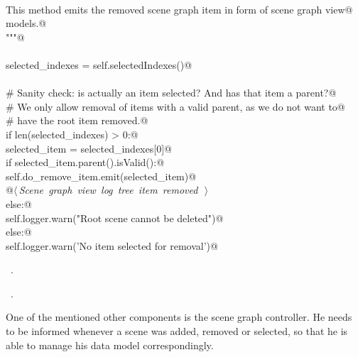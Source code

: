 \documentclass[
    a4paper,      %
    10pt,         %
    openright,    %
    notitlepage,  %
    parskip=half, %
]{scrreprt}       %
\theoremstyle{definition}                    %
\begin{document}
\begin{flushleft}
\begin{minipage}{\linewidth}
\begin{list}{}{}
\mbox{}\lstinline@@\\
\mbox{}\lstinline@    This method emits the removed scene graph item in form of scene graph view@\\
\mbox{}\lstinline@    models.@\\
\mbox{}\lstinline@    """@\\
\mbox{}\lstinline@@\\
\mbox{}\lstinline@    selected_indexes = self.selectedIndexes()@\\
\mbox{}\lstinline@@\\
\mbox{}\lstinline@    # Sanity check: is actually an item selected? And has that item a parent?@\\
\mbox{}\lstinline@    # We only allow removal of items with a valid parent, as we do not want to@\\
\mbox{}\lstinline@    # have the root item removed.@\\
\mbox{}\lstinline@    if len(selected_indexes) > 0:@\\
\mbox{}\lstinline@        selected_item = selected_indexes[0]@\\
\mbox{}\lstinline@        if selected_item.parent().isValid():@\\
\mbox{}\lstinline@            self.do_remove_item.emit(selected_item)@\\
\mbox{}\lstinline@            @\hbox{$\langle\,${\itshape Scene graph view log tree item removed}\nobreak\ {\footnotesize {}}$\,\rangle$}\lstinline@@\\
\mbox{}\lstinline@        else:@\\
\mbox{}\lstinline@            self.logger.warn("Root scene cannot be deleted")@\\
\mbox{}\lstinline@    else:@\\
\mbox{}\lstinline@        self.logger.warn('No item selected for removal')@\\
\mbox{}\lstinline@@{\NWsep}
\end{list}
\vspace{-1.5ex}
\footnotesize
\begin{list}{}{\setlength{\itemsep}{-\parsep}\setlength{\itemindent}{-\leftmargin}}
\item \NWtxtMacroDefBy\ .
\item \NWtxtMacroRefIn\ .

\item{}
\end{list}
\end{minipage}\vspace{4ex}
\end{flushleft}
One of the mentioned other components is the scene graph controller. He needs to
be informed whenever a scene was added, removed or selected, so that he is able to
manage his data model correspondingly.
\end{document}
